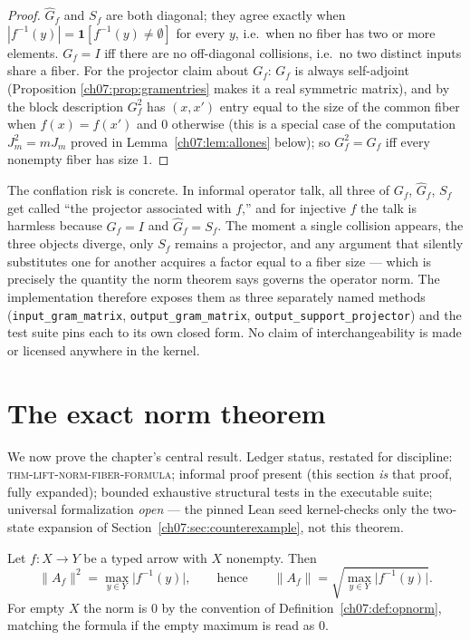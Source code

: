\begin{proof}
$\widehat{G}_f$ and $S_f$ are both diagonal; they agree exactly when
$|f^{-1}(y)|=\mathbf{1}[f^{-1}(y)\neq\emptyset]$ for every $y$, i.e.\ when no
fiber has two or more elements. $G_f=I$ iff there are no off-diagonal
collisions, i.e.\ no two distinct inputs share a fiber. For the projector
claim about $G_f$: $G_f$ is always self-adjoint (Proposition
\ref{ch07:prop:gramentries} makes it a real symmetric matrix), and by the
block description $G_f^2$ has $(x,x')$ entry equal to the size of the common
fiber when $f(x)=f(x')$ and $0$ otherwise (this is a special case of the
computation $J_m^2=mJ_m$ proved in Lemma~\ref{ch07:lem:allones} below); so
$G_f^2=G_f$ iff every nonempty fiber has size $1$.
\end{proof}

\begin{boundary}\label{ch07:bd:threemethods}
The conflation risk is concrete. In informal operator talk, all three of
$G_f$, $\widehat{G}_f$, $S_f$ get called ``the projector associated with
$f$,'' and for injective $f$ the talk is harmless because
$G_f=I$ and $\widehat{G}_f=S_f$. The moment a single collision appears, the
three objects diverge, only $S_f$ remains a projector, and any argument that
silently substitutes one for another acquires a factor equal to a fiber size
--- which is precisely the quantity the norm theorem says governs the
operator norm. The implementation therefore exposes them as three separately
named methods (\texttt{input\_gram\_matrix}, \texttt{output\_gram\_matrix},
\texttt{output\_support\_projector}) and the test suite pins each to its own
closed form. No claim of interchangeability is made or licensed anywhere in
the kernel.
\end{boundary}

\section{The exact norm theorem}\label{ch07:sec:norm}

We now prove the chapter's central result. Ledger status, restated for
discipline: \textsc{thm-lift-norm-fiber-formula}; informal proof present
(this section \emph{is} that proof, fully expanded); bounded exhaustive
structural tests in the executable suite; universal formalization
\emph{open} --- the pinned Lean seed kernel-checks only the two-state
expansion of Section~\ref{ch07:sec:counterexample}, not this theorem.

\begin{theorem}\label{ch07:thm:norm}
Let $f:X\to Y$ be a typed arrow with $X$ nonempty. Then
\[
\lVert A_f\rVert^2=\max_{y\in Y}\bigl|f^{-1}(y)\bigr|,
\qquad\text{hence}\qquad
\lVert A_f\rVert=\sqrt{\max_{y\in Y}\bigl|f^{-1}(y)\bigr|}.
\]
For empty $X$ the norm is $0$ by the convention of
Definition~\ref{ch07:def:opnorm}, matching the formula if the empty maximum
is read as $0$.
\end{theorem}

